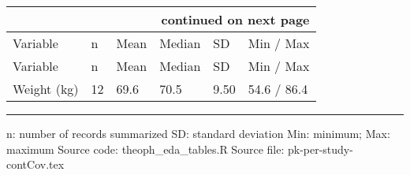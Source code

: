 \renewcommand{\arraystretch}{1.3}
\setlength{\tabcolsep}{5pt} 
\setlength{\extrarowheight}{0em}
\begin{longtable}{llllll}
\endhead
\hline
\multicolumn{6}{r}{\footnotesize{continued on next page}}
\endfoot
\hline
\endlastfoot
\caption{\testmacro \label{pk-per-study-contCov}} \\
\hline
Variable & n & Mean & Median & SD & Min / Max \\
\hline
\endfirsthead
\hline
Variable & n & Mean & Median & SD & Min / Max \\
\hline
\endhead
\hline
Weight (kg) & 12 & 69.6 & 70.5 & 9.50 & 54.6 / 86.4 \\
\hline
\end{longtable}
\begin{center}
 
\vspace{0.67cm}
 
\begin{minipage}{1\linewidth}
\linespread{1.1}\selectfont
\rule{1\linewidth}{0.4pt}
\vspace{0.02cm}
n: number of records summarized \newline
SD: standard deviation \newline
Min: minimum; Max: maximum \newline
Source code: theoph\_eda\_tables.R \newline
Source file: pk-per-study-contCov.tex \newline
\end{minipage}
\end{center}
